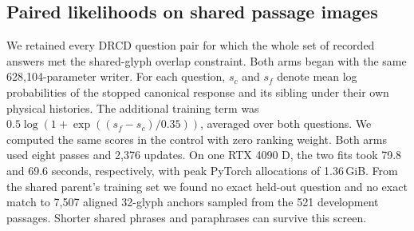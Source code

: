 \subsection*{Paired likelihoods on shared passage images}
We retained every DRCD question pair for which the whole set of recorded answers met the shared-glyph overlap constraint. Both arms began with the same 628,104-parameter writer. For each question, $s_c$ and $s_f$ denote mean log probabilities of the stopped canonical response and its sibling under their own physical histories. The additional training term was $0.5\log(1+\exp((s_f-s_c)/0.35))$, averaged over both questions. We computed the same scores in the control with zero ranking weight. Both arms used eight passes and 2,376 updates. On one RTX 4090 D, the two fits took 79.8 and 69.6 seconds, respectively, with peak PyTorch allocations of 1.36\,GiB. From the shared parent's training set we found no exact held-out question and no exact match to 7,507 aligned 32-glyph anchors sampled from the 521 development passages. Shorter shared phrases and paraphrases can survive this screen.
